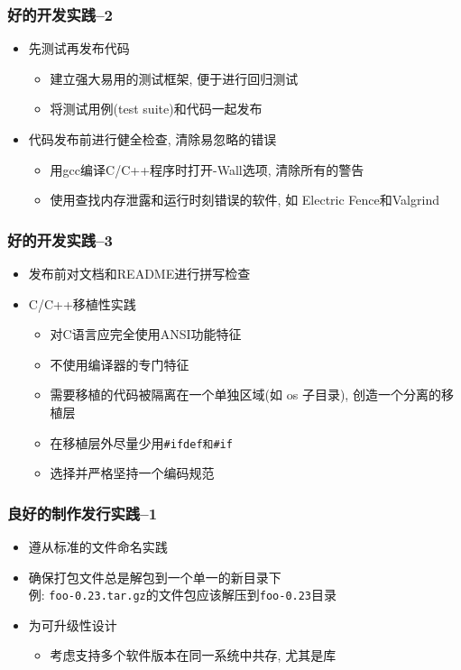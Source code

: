 \documentclass[compress]{beamer}
\begin{document}
\begin{frame}
\frametitle{好的开发实践--2}
\begin{itemize}
\item 先测试再发布代码
    \begin{itemize}
    \item 建立强大易用的测试框架, 便于进行回归测试
    \item 将测试用例(test suite)和代码一起发布
    \end{itemize}
\item 代码发布前进行健全检查, 清除易忽略的错误
    \begin{itemize}
    \item 用\alert{gcc}编译C/C++程序时打开-Wall选项, 清除所有的警告
    \item 使用查找内存泄露和运行时刻错误的软件, 如 Electric Fence和Valgrind
    \end{itemize}

\end{itemize}


\end{frame}

\begin{frame}[fragile]
\frametitle{好的开发实践--3}

\begin{itemize}
\item 发布前对文档和README进行拼写检查
\item C/C++移植性实践
    \begin{itemize}
    \item 对C语言应完全使用ANSI功能特征
    \item 不使用编译器的专门特征
    \item 需要移植的代码被隔离在一个单独区域(如 os 子目录), 创造一个分离的移植层
    \item 在移植层外尽量少用\verb~#ifdef和#if~
    \item 选择并严格坚持一个编码规范
    \end{itemize}
\end{itemize}


\end{frame}

\begin{frame}[fragile]
\frametitle{良好的制作发行实践--1}
\begin{itemize}
\item 遵从标准的文件命名实践
\item 确保打包文件总是解包到一个单一的新目录下\\
例: \verb~foo-0.23.tar.gz~的文件包应该解压到\verb~foo-0.23~目录
\item 为可升级性设计
    \begin{itemize}
    \item 考虑支持多个软件版本在同一系统中共存, 尤其是库
    \end{itemize}
\end{itemize}


\end{frame}
\end{document}

